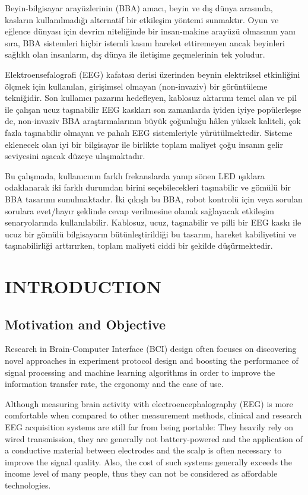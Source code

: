 \documentclass[12pt]{article}
\newcommand\mysection[1]{\vspace*{-0.35cm}\section{#1}\vspace*{6pt}\thispagestyle{empty}}
\newcommand\mysubsection[1]{\subsection{#1}}
\numberwithin{equation}{section}
\numberwithin{figure}{section}
\numberwithin{table}{section}
\begin{document}
\par{
    Beyin-bilgisayar arayüzlerinin (BBA) amacı, beyin ve dış dünya arasında, kasların
    kullanılmadığı alternatif bir etkileşim yöntemi sunmaktır. Oyun ve eğlence dünyası için devrim niteliğinde
    bir insan-makine arayüzü olmasının yanı sıra, BBA sistemleri hiçbir istemli kasını
    hareket ettiremeyen ancak beyinleri sağlıklı olan insanların, dış dünya ile iletişime geçmelerinin
    tek yoludur.
}
\par{
    Elektroensefalografi (EEG) kafatası derisi üzerinden beynin elektriksel
    etkinliğini ölçmek için kullanılan, girişimsel olmayan (non-invaziv) bir
    görüntüleme tekniğidir. Son kullanıcı pazarını hedefleyen,
    kablosuz aktarımı temel alan ve pil ile çalışan ucuz taşınabilir EEG kaskları son
    zamanlarda iyiden iyiye popülerleşse de, non-invaziv BBA araştırmalarının
    büyük çoğunluğu hâlen yüksek kaliteli, çok fazla taşınabilir olmayan
    ve pahalı EEG sistemleriyle yürütülmektedir. Sisteme eklenecek olan
    iyi bir bilgisayar ile birlikte toplam maliyet çoğu insanın gelir seviyesini
    aşacak düzeye ulaşmaktadır.
}
\par{
    Bu çalışmada, kullanıcının farklı frekanslarda yanıp sönen LED ışıklara
    odaklanarak iki farklı durumdan birini seçebilecekleri taşınabilir ve gömülü
    bir BBA tasarımı sunulmaktadır. İki çıkışlı bu BBA, robot kontrolü için veya
    sorulan sorulara evet/hayır şeklinde cevap verilmesine olanak sağlayacak
    etkileşim senaryolarında kullanılabilir. Kablosuz, ucuz, taşınabilir ve pilli bir EEG
    kaskı ile ucuz bir gömülü bilgisayarın bütünleştirildiği bu tasarım,
    hareket kabiliyetini ve taşınabilirliği arttırırken, toplam maliyeti
    ciddi bir şekilde düşürmektedir.
}
\clearpage

\mysection{INTRODUCTION}
\thispagestyle{fancy}
\cfoot{}

\mysubsection{Motivation and Objective}
\par{
    Research in Brain-Computer Interface (BCI) design often focuses
    on discovering novel approaches in experiment protocol design and
    boosting the performance of signal processing and machine learning algorithms
    in order to improve the information transfer rate, the ergonomy and the
    ease of use.
}

\par{
    Although measuring brain activity with electroencephalography (EEG) is more
    comfortable when compared to other measurement methods, clinical and research
    EEG acquisition systems are still far from being portable: They heavily
    rely on wired transmission, they are generally not battery-powered and
    the application of a conductive material between electrodes and the scalp is
    often necessary to improve the signal quality. Also, the cost of such systems
    generally exceeds the income level of many people, thus they can not be
    considered as affordable technologies.
}
\end{document}
